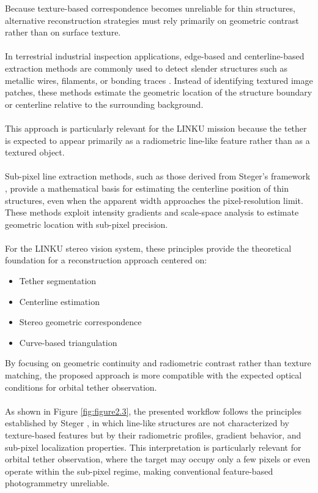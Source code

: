 Because texture-based correspondence becomes unreliable for thin structures, alternative reconstruction strategies must rely primarily on geometric contrast rather than on surface texture.
\\\\
In terrestrial industrial inspection applications, edge-based and centerline-based extraction methods are commonly used to detect slender structures such as metallic wires, filaments, or bonding traces \cite{yu2023bonding}. Instead of identifying textured image patches, these methods estimate the geometric location of the structure boundary or centerline relative to the surrounding background.
\\\\
This approach is particularly relevant for the LINKU mission because the tether is expected to appear primarily as a radiometric line-like feature rather than as a textured object.
\\\\
Sub-pixel line extraction methods, such as those derived from Steger's framework \cite{steger2000subpixel}, provide a mathematical basis for estimating the centerline position of thin structures, even when the apparent width approaches the pixel-resolution limit. These methods exploit intensity gradients and scale-space analysis to estimate geometric location with sub-pixel precision.
\\\\
For the LINKU stereo vision system, these principles provide the theoretical foundation for a reconstruction approach centered on:

\begin{itemize}
    \item Tether segmentation
    \item Centerline estimation
    \item Stereo geometric correspondence
    \item Curve-based triangulation
\end{itemize}

By focusing on geometric continuity and radiometric contrast rather than texture matching, the proposed approach is more compatible with the expected optical conditions for orbital tether observation.
\\\\
As shown in Figure \ref{fig:figure2.3}, the presented workflow follows the principles established by Steger \cite{steger2000subpixel}, in which line-like structures are not characterized by texture-based features but by their radiometric profiles, gradient behavior, and sub-pixel localization properties. This interpretation is particularly relevant for orbital tether observation, where the target may occupy only a few pixels or even operate within the sub-pixel regime, making conventional feature-based photogrammetry unreliable.

